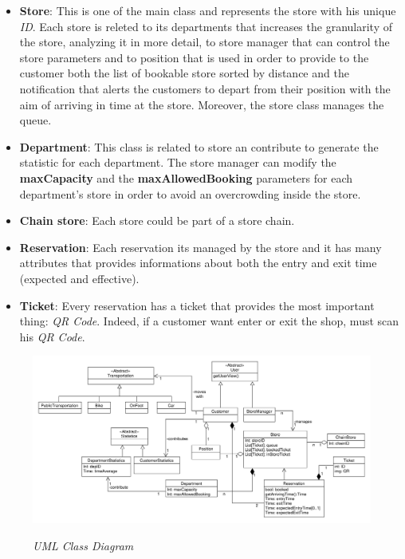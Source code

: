 \documentclass{article}
\begin{document}
\begin{itemize}
\begin{itemize}
				\end{itemize}
			
				\item {\bfseries Store}: This is one of the main class and represents the store with his unique \emph{ID}. Each store is releted to its departments that increases the granularity of the store, analyzing it in more detail, to store manager that can control the store parameters and to position that is used in order to provide to the customer both the list of bookable store sorted by distance and the notification that alerts the customers to depart from their position with the aim of arriving in time at the store. Moreover, the store class manages the queue.
				
				\item {\bfseries Department}: This class is related to store an contribute to generate the statistic for each department. The store manager can modify the {\bfseries maxCapacity} and the {\bfseries maxAllowedBooking} parameters for each department's store in order to avoid an overcrowding inside the store.
				
				\item {\bfseries Chain store}: Each store could be part of a store chain.
				
				\item {\bfseries Reservation}: Each reservation its managed by the store and it has many attributes that provides informations about both the entry and exit time (expected and effective).
				
				\item {\bfseries Ticket}: Every reservation has a ticket that provides the most important thing: \emph{QR Code}. Indeed, if a customer want enter or exit the shop, must scan his \emph{QR Code}.
			\end{itemize}
		
			\begin{figure}
			\begin{adjustwidth}{-3cm}{}
				\centering
				\includegraphics[scale=0.45, angle=90, trim= 0 0 0 -5cm]{ClassDiagrams/classDiagram.pdf} \\
				\caption{\emph{UML Class Diagram}}
			\end{adjustwidth}
		\end{figure}
	
\end{document}
